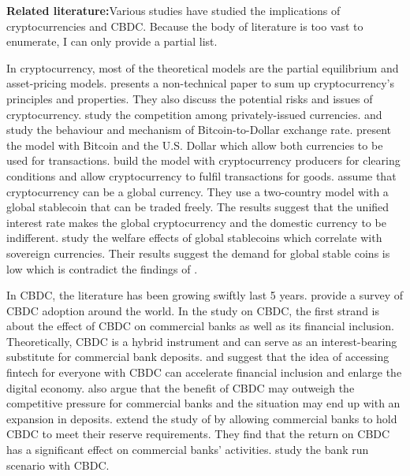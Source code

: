 \documentclass[12pt, a4paper]{article}
\begin{document}
\textbf{Related literature:}Various studies have studied the implications of cryptocurrencies and CBDC. Because the body of literature is too vast to enumerate, I can only provide a partial list.

In cryptocurrency, most of the theoretical models are the partial equilibrium and asset-pricing models. \cite{bohme2015bitcoin} presents a non-technical paper to sum up cryptocurrency's principles and properties. They also discuss the potential risks and issues of cryptocurrency. \cite{fernandez2019can} study the competition among privately-issued currencies.\cite{athey2016bitcoin} and \cite{garratt2018bitcoin} study the behaviour and mechanism of Bitcoin-to-Dollar exchange rate. \cite{schilling2019currency} present the model with Bitcoin and the U.S. Dollar which allow both currencies to be used for transactions. \cite{sockin2018model} build the model with cryptocurrency producers for clearing conditions and allow cryptocurrency to fulfil transactions for goods. \cite{benigno2019monetary} assume that cryptocurrency can be a global currency. They use a two-country model with a global stablecoin that can be traded freely. The results suggest that the unified interest rate makes the global cryptocurrency and the domestic currency to be indifferent. \cite{baughman2022global} study the welfare effects of global stablecoins which correlate with sovereign currencies. Their results suggest the demand for global stable coins is low which is contradict the findings of \cite{benigno2019monetary}.

In CBDC, the literature has been growing swiftly last 5 years. \cite{boar2021ready} provide a survey of CBDC adoption around the world. In the study on CBDC, the first strand is about the effect of CBDC on commercial banks as well as its financial inclusion. Theoretically, CBDC is a hybrid instrument and can serve as an interest-bearing substitute for commercial bank deposits. \cite{foster2021digital} and \cite{andolfatto2021assessing} suggest that the idea of accessing fintech for everyone with CBDC can accelerate financial inclusion and enlarge the digital economy. \cite{andolfatto2021assessing}  also argue that the benefit of CBDC may outweigh the competitive pressure for commercial banks and the situation may end up with an expansion in deposits. \cite{chiu2019bank} extend the study of \cite{andolfatto2021assessing} by allowing commercial banks to hold CBDC to meet their reserve requirements. They find that the return on CBDC has a significant effect on commercial banks' activities. \cite{fernandez2021central} study the bank run scenario with CBDC.
\end{document}
